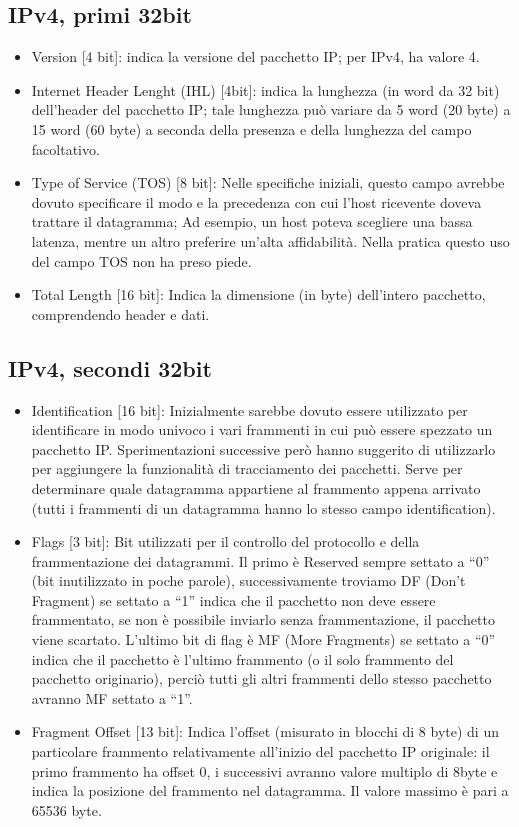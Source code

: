 \subsection{IPv4, primi 32bit}
\begin{itemize}
\item	Version [4 bit]: indica la versione del pacchetto IP; per IPv4, ha valore 4.
\item	Internet Header Lenght (IHL) [4bit]: indica la lunghezza (in word da 32 bit) dell'header del pacchetto IP; tale lunghezza può variare da 5 word (20 byte) a 15 word (60 byte) a seconda della presenza e della lunghezza del campo facoltativo.
\item	Type of Service (TOS) [8 bit]: Nelle specifiche iniziali, questo campo avrebbe dovuto specificare il modo e la precedenza con cui l'host ricevente doveva trattare il datagramma;
Ad esempio, un host poteva scegliere una bassa latenza, mentre un altro preferire un'alta affidabilità. Nella pratica questo uso del campo TOS non ha preso piede.
\item	Total Length [16 bit]: Indica la dimensione (in byte) dell'intero pacchetto, comprendendo header e dati.
\end{itemize}

\subsection{IPv4, secondi 32bit}
\begin{itemize}
\item	Identification [16 bit]: Inizialmente sarebbe dovuto essere utilizzato per identificare in modo univoco i vari frammenti in cui può essere spezzato un pacchetto IP. Sperimentazioni successive però hanno suggerito di utilizzarlo per aggiungere la funzionalità di tracciamento dei pacchetti. Serve per determinare quale datagramma appartiene al frammento appena arrivato (tutti i frammenti di un datagramma hanno lo stesso campo identification).
\item	Flags [3 bit]: Bit utilizzati per il controllo del protocollo e della frammentazione dei datagrammi. Il primo è Reserved sempre settato a “0” (bit inutilizzato in poche parole), successivamente troviamo DF (Don't Fragment) se settato a “1” indica che il pacchetto non deve essere frammentato, se non è possibile inviarlo senza frammentazione, il pacchetto viene scartato. L'ultimo bit di flag è MF (More Fragments) se settato a “0” indica che il pacchetto è l'ultimo frammento (o il solo frammento del pacchetto originario), perciò tutti gli altri frammenti dello stesso pacchetto avranno MF settato a “1”. 
\item	Fragment Offset [13 bit]: Indica l'offset (misurato in blocchi di 8 byte) di un particolare frammento relativamente all'inizio del pacchetto IP originale: il primo frammento ha offset 0, i successivi avranno valore multiplo di 8byte e indica la posizione del frammento nel datagramma. Il valore massimo è pari a 65536 byte.
\end{itemize}

